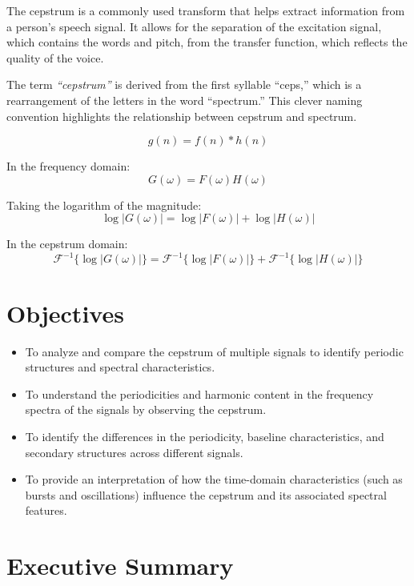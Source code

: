 \documentclass[a4paper,12pt]{article}
\begin{document}
The cepstrum is a commonly used transform that helps extract information from a person’s speech signal. It allows for the separation of the excitation signal, which contains the words and pitch, from the transfer function, which reflects the quality of the voice.

The term \textit{“cepstrum”} is derived from the first syllable “ceps,” which is a rearrangement of the letters in the word “spectrum.” This clever naming convention highlights the relationship between cepstrum and spectrum.

\begin{equation}
g(n) = f(n) * h(n)
\end{equation}

In the frequency domain:
\begin{equation}
G(\omega) = F(\omega)H(\omega)
\end{equation}

Taking the logarithm of the magnitude:
\begin{equation}
\log |G(\omega)| = \log |F(\omega)| + \log |H(\omega)|
\end{equation}

In the cepstrum domain:
\begin{equation}
\mathcal{F}^{-1} \{ \log |G(\omega)| \} = \mathcal{F}^{-1} \{ \log |F(\omega)| \} + \mathcal{F}^{-1} \{ \log |H(\omega)| \}
\end{equation}
\section*{Objectives}
\begin{itemize}
    \item To analyze and compare the cepstrum of multiple signals to identify periodic structures and spectral characteristics.
    \item To understand the periodicities and harmonic content in the frequency spectra of the signals by observing the cepstrum.
    \item To identify the differences in the periodicity, baseline characteristics, and secondary structures across different signals.
    \item To provide an interpretation of how the time-domain characteristics (such as bursts and oscillations) influence the cepstrum and its associated spectral features.
\end{itemize}
\section{Executive Summary}
\end{document}
